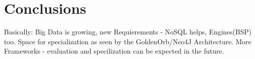 \documentclass{acm_proc_article-sp}
\begin{document}
\section{Conclusions}

Basically: Big Data is growing, new Requierements - NoSQL helps, Engines(BSP) too.
Space for specialization as seen by the GoldenOrb/Neo4J Architecture.
More Frameworks - evaluation and specilization can be expected in the future.


%

%
%
\end{document}
